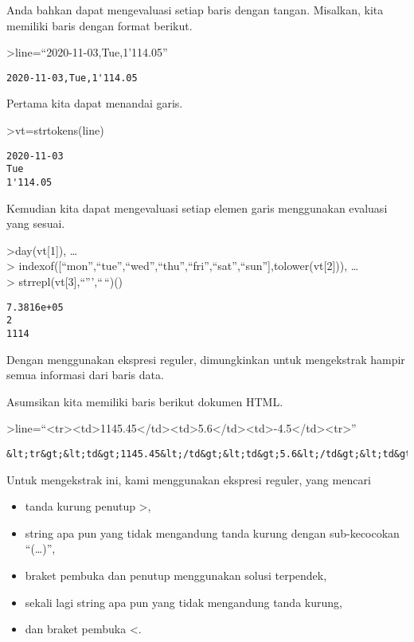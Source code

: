\documentclass[
]{book}
\providecommand{\tightlist}{%
  \setlength{\itemsep}{0pt}\setlength{\parskip}{0pt}}
\begin{document}
Anda bahkan dapat mengevaluasi setiap baris dengan tangan. Misalkan, kita memiliki baris dengan format berikut.

\textgreater line=``2020-11-03,Tue,1'114.05''

\begin{verbatim}
2020-11-03,Tue,1'114.05
\end{verbatim}

Pertama kita dapat menandai garis.

\textgreater vt=strtokens(line)

\begin{verbatim}
2020-11-03
Tue
1'114.05
\end{verbatim}

Kemudian kita dapat mengevaluasi setiap elemen garis menggunakan evaluasi yang sesuai.

\textgreater day(vt{[}1{]}), \ldots{}\\
\textgreater{} indexof({[}``mon'',``tue'',``wed'',``thu'',``fri'',``sat'',``sun''{]},tolower(vt{[}2{]})), \ldots{}\\
\textgreater{} strrepl(vt{[}3{]},``''',``\,``)()

\begin{verbatim}
7.3816e+05
2
1114
\end{verbatim}

Dengan menggunakan ekspresi reguler, dimungkinkan untuk mengekstrak hampir semua informasi dari baris data.

Asumsikan kita memiliki baris berikut dokumen HTML.

\textgreater line=``\textless tr\textgreater\textless td\textgreater1145.45\textless/td\textgreater\textless td\textgreater5.6\textless/td\textgreater\textless td\textgreater-4.5\textless/td\textgreater\textless tr\textgreater{}''

\begin{verbatim}
&lt;tr&gt;&lt;td&gt;1145.45&lt;/td&gt;&lt;td&gt;5.6&lt;/td&gt;&lt;td&gt;-4.5&lt;/td&gt;&lt;tr&gt;
\end{verbatim}

Untuk mengekstrak ini, kami menggunakan ekspresi reguler, yang mencari

\begin{itemize}
\tightlist
\item
  tanda kurung penutup \textgreater,
\item
  string apa pun yang tidak mengandung tanda kurung dengan sub-kecocokan ``(\ldots)'',
\item
  braket pembuka dan penutup menggunakan solusi terpendek,
\item
  sekali lagi string apa pun yang tidak mengandung tanda kurung,
\item
  dan braket pembuka \textless.
\end{itemize}
\end{document}
